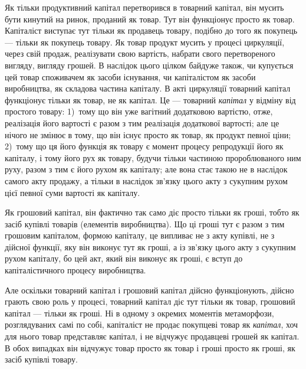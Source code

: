 
Як тільки продуктивний капітал перетворився в товарний капітал,
він мусить бути кинутий на ринок, проданий як товар.
Тут він функціонує просто як товар. Капіталіст виступає тут
тільки як продавець товару, подібно до того як покупець —
тільки як покупець товару. Як товар продукт мусить у процесі
циркуляції, через свій продаж, реалізувати свою вартість, набрати
свого перетвореного вигляду, вигляду грошей. В наслідок
цього цілком байдуже також, чи купується цей товар споживачем
як засоби існування, чи капіталістом як засоби виробництва,
як складова частина капіталу. В акті циркуляції товарний
капітал функціонує тільки як товар, не як капітал. Це — товарний \emph{капітал} у відміну від простого
товару: 1)~тому що він
уже вагітний додатковою вартістю, отже, реалізація його вартості
є разом з тим реалізація додаткової вартості; але це нічого не
змінює в тому, що він існує просто як товар, як продукт певної
ціни; 2)~тому що ця його функція як товару є момент процесу
репродукції його як капіталу, і тому його рух як товару,
будучи тільки частиною пророблюваного ним руху, разом з тим
є його рухом як капіталу; але вона стає такою не в наслідок
самого акту продажу, а тільки в наслідок зв’язку цього акту
з сукупним рухом цієї певної суми вартості як капіталу.

Як грошовий капітал, він фактично так само діє просто тільки
як гроші, тобто як засіб купівлі товарів (елементів виробництва).
Що ці гроші тут є разом з тим грошовим капіталом, формою капіталу,
це випливає не з акту купівлі, не з дійсної функції, яку
він виконує тут як гроші, а із зв’язку цього акту з сукупним
рухом капіталу, бо цей акт, який він виконує як гроші, є вступ
до капіталістичного процесу виробництва.

Але оскільки товарний капітал і грошовий капітал дійсно
функціонують, дійсно грають свою роль у процесі, товарний капітал
діє тут тільки як товар, грошовий капітал — тільки як гроші.
Ні в одному з окремих моментів метаморфози, розглядуваних самі
по собі, капіталіст не продає покупцеві товар як \emph{капітал}, хоч
для нього товар представляє капітал, і не відчужує продавцеві
грошей як капітал. В обох випадках він відчужує товар
просто як товар і гроші просто як гроші, як засіб купівлі
товару.

